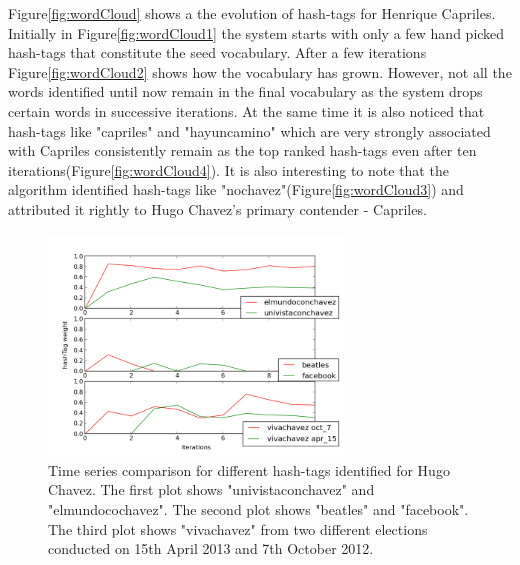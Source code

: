 Figure\ref{fig:wordCloud} shows a  the evolution  of hash-tags for Henrique Capriles.
Initially in Figure\ref{fig:wordCloud1} the system starts with only a few hand picked hash-tags that constitute the seed vocabulary. 
After a few iterations Figure\ref{fig:wordCloud2} shows how the vocabulary has grown.
However, not all the words identified until now remain in the final vocabulary as the system drops certain words in successive iterations.
At the same time it is also noticed that hash-tags like "capriles" and "hayuncamino" which are very strongly associated with Capriles consistently remain as the top ranked hash-tags even after ten iterations(Figure\ref{fig:wordCloud4}). 
It is also interesting to note that the algorithm identified hash-tags like "nochavez"(Figure\ref{fig:wordCloud3}) and attributed it rightly to Hugo Chavez's primary contender - Capriles. 
\newline
\begin{figure}[Ht]
	\centering
	\includegraphics[width=0.7\textwidth, height=0.3\textheight]{support_files/hashTagTimeSeries.png}
\vspace{-1em}
	\caption{Time series comparison for different hash-tags identified for Hugo Chavez. The first plot shows "univistaconchavez" and "elmundocochavez". The second plot shows "beatles" and "facebook". The third plot shows "vivachavez" from two different elections conducted on 15th April 2013 and 7th October 2012.}
	\label{fig:timeSeries}
	\vspace{-1em}
\end{figure}

